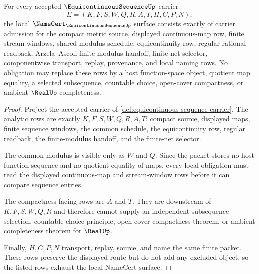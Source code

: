 \begin{theorem}
\label{thm:equicontinuous-sequence-namecert-obligations}
For every accepted $\EquicontinuousSequenceUp$ carrier
$$
E=(K,F,S,W,Q,R,A,T,H,C,P,N),
$$
the local $\NameCert_{\EquicontinuousSequenceUp}$ surface consists exactly of carrier admission for the compact metric source, displayed continuous-map row, finite stream windows, shared modulus schedule, equicontinuity row, regular rational readback, Arzela--Ascoli finite-modulus handoff, finite-net selector, componentwise transport, replay, provenance, and local naming rows. No obligation may replace these rows by a host function-space object, quotient map equality, a selected subsequence, countable choice, open-cover compactness, or ambient $\RealUp$ completeness.
\end{theorem}
\begin{proof}
Project the accepted carrier of \autoref{def:equicontinuous-sequence-carrier}. The analytic rows are exactly $K,F,S,W,Q,R,A,T$: compact source, displayed maps, finite sequence windows, the common schedule, the equicontinuity row, regular readback, the finite-modulus handoff, and the finite-net selector.

The common modulus is visible only as $W$ and $Q$. Since the packet stores no host function sequence and no quotient equality of maps, every local obligation must read the displayed continuous-map and stream-window rows before it can compare sequence entries.

The compactness-facing rows are $A$ and $T$. They are downstream of $K,F,S,W,Q,R$ and therefore cannot supply an independent subsequence selection, countable-choice principle, open-cover compactness theorem, or ambient completeness theorem for $\RealUp$.

Finally, $H,C,P,N$ transport, replay, source, and name the same finite packet. These rows preserve the displayed route but do not add any excluded object, so the listed rows exhaust the local NameCert surface.
\end{proof}

